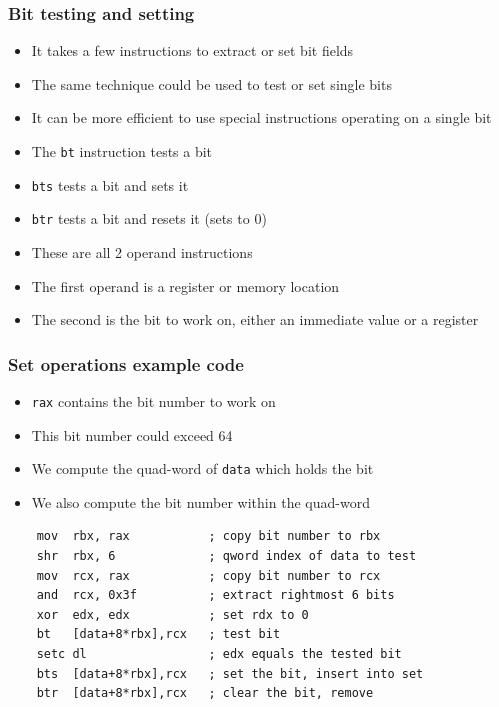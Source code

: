 \documentclass{beamer}
\begin{document}
\begin{frame}[fragile]
    \frametitle{Bit testing and setting}
    \begin{itemize}
        \item It takes a few instructions to extract or set bit fields
        \item The same technique could be used to test or set single
              bits
        \item It can be more efficient to use special instructions
              operating on a single bit     
        \item The {\tt bt} instruction tests a bit
        \item {\tt bts} tests a bit and sets it
        \item {\tt btr} tests a bit and resets it (sets to 0)
        \item These are all 2 operand instructions
        \item The first operand is a register or memory location
        \item The second is the bit to work on, either an immediate
              value or a register
    \end{itemize}
\end{frame}

\begin{frame}[fragile]
    \frametitle{Set operations example code}
    \begin{itemize}
        \item {\tt rax} contains the bit number to work on
        \item This bit number could exceed 64
        \item We compute the quad-word of {\tt data} which 
              holds the bit
        \item We also compute the bit number within the quad-word
    \end{itemize}

\begin{verbatim}
    mov  rbx, rax           ; copy bit number to rbx
    shr  rbx, 6             ; qword index of data to test
    mov  rcx, rax           ; copy bit number to rcx
    and  rcx, 0x3f          ; extract rightmost 6 bits
    xor  edx, edx           ; set rdx to 0
    bt   [data+8*rbx],rcx   ; test bit
    setc dl                 ; edx equals the tested bit
    bts  [data+8*rbx],rcx   ; set the bit, insert into set
    btr  [data+8*rbx],rcx   ; clear the bit, remove
\end{verbatim}
\end{frame}
\end{document}
